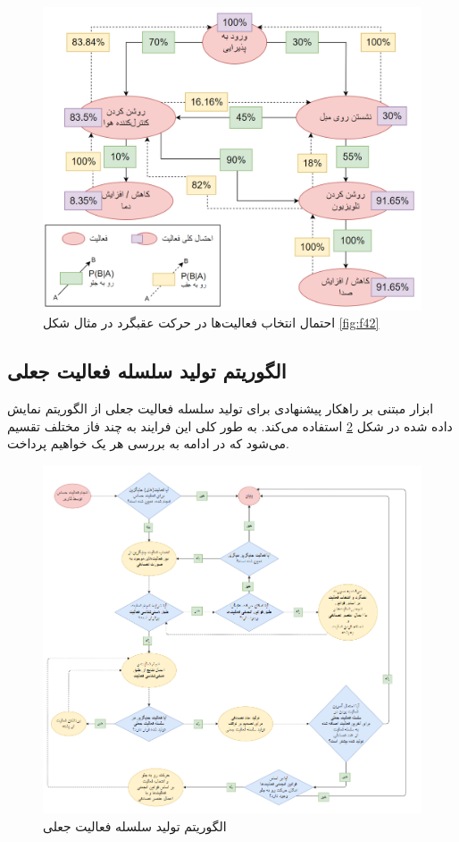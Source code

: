 \begin{figure}[htp]
\centerline{\includegraphics[width=1\textwidth]{figs/f44.png}}
\caption[احتمال انتخاب فعالیت‌ها در حرکت عقبگرد]{احتمال انتخاب فعالیت‌ها در حرکت عقبگرد در مثال شکل \ref{fig:f42}}
\label{fig:f44}
\end{figure}

\subsection{‌الگوریتم تولید سلسله فعالیت جعلی}

ابزار مبتنی بر راهکار پیشنهادی برای تولید سلسله فعالیت جعلی از الگوریتم نمایش داده شده در شکل \ref{fig:f43} استفاده می‌کند. به طور کلی این فرایند به چند فاز مختلف تقسیم می‌شود که در ادامه به بررسی هر یک خواهیم پرداخت.

\begin{figure}[htp]
\centerline{\includegraphics[width=1\textwidth]{figs/f43.png}}
\caption{الگوریتم تولید سلسله فعالیت جعلی}
\label{fig:f43}
\end{figure}

